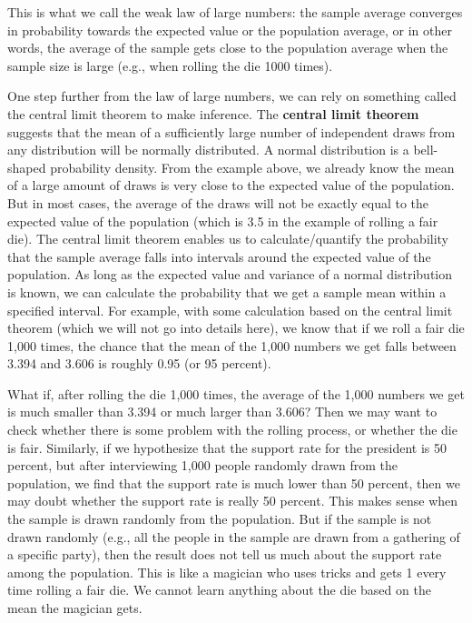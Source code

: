 \documentclass{book}
\begin{document}
This is what we call the weak law of large numbers: the sample average
converges in probability towards the expected value or the population average,
or in other words, the average of the sample gets close to the population
average when the sample size is large (e.g., when rolling the die 1000 times).

One step further from the law of large numbers, we can rely on something
called the central limit theorem to make inference. The \textbf{central limit
theorem} suggests that the mean of a sufficiently large number of independent
draws from any distribution will be normally distributed. A normal
distribution is a bell-shaped probability density. From the example above, we
already know the mean of a large amount of draws is very close to the expected
value of the population. But in most cases, the average of the draws will not
be exactly equal to the expected value of the population (which is 3.5 in the
example of rolling a fair die). The central limit theorem enables us to
calculate/quantify the probability that the sample average falls into
intervals around the expected value of the population. As long as the expected
value and variance of a normal distribution is known, we can calculate the
probability that we get a sample mean within a specified interval. For
example, with some calculation based on the central limit theorem (which we
will not go into details here), we know that if we roll a fair die 1,000
times, the chance that the mean of the 1,000 numbers we get falls between
3.394 and 3.606 is roughly 0.95 (or 95 percent).

What if, after rolling the die 1,000 times, the average of the 1,000 numbers
we get is much smaller than 3.394 or much larger than 3.606? Then we may want
to check whether there is some problem with the rolling process, or whether
the die is fair. Similarly, if we hypothesize that the support rate for the
president is 50 percent, but after interviewing 1,000 people randomly drawn
from the population, we find that the support rate is much lower than 50
percent, then we may doubt whether the support rate is really 50 percent. This
makes sense when the sample is drawn randomly from the population. But if the
sample is not drawn randomly (e.g., all the people in the sample are drawn
from a gathering of a specific party), then the result does not tell us much
about the support rate among the population. This is like a magician who uses
tricks and gets 1 every time rolling a fair die. We cannot learn anything
about the die based on the mean the magician gets.
\end{document}

